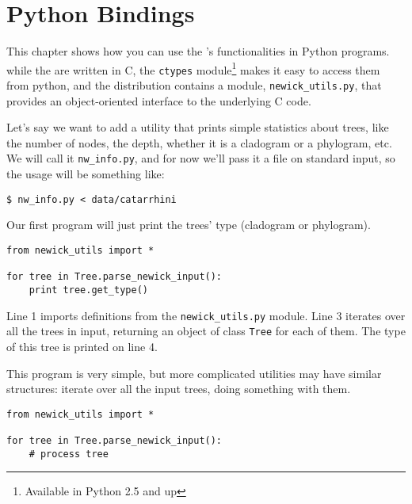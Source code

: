 
\chapter{Python Bindings}
\label{chap_python_lib}

This chapter shows how you can use the \nutils{}'s functionalities in Python
programs. while the \nutils{} are written in C, the \texttt{ctypes}
module\footnote{Available in Python 2.5 and up} makes it easy to access them
from python, and the distribution contains a module, \texttt{newick\_utils.py},
that provides an object-oriented interface to the underlying C code.

Let's say we want to add a utility that prints simple statistics about trees,
like the number of nodes, the depth, whether it is a cladogram or a phylogram,
etc. We will call it \texttt{nw\_info.py}, and for now we'll pass it a \nw{}
file on standard input, so the usage will be something like:

\begin{verbatim}
$ nw_info.py < data/catarrhini
\end{verbatim}

\noindent{}Our first program will just print the trees' type (cladogram or
phylogram).

\begin{lstlisting}
from newick_utils import *

for tree in Tree.parse_newick_input():
    print tree.get_type()
\end{lstlisting}

\noindent{}Line 1 imports definitions from the \texttt{newick\_utils.py}
module. Line 3 iterates over all the trees in input, returning an object of
class \texttt{Tree} for each of them. The type of this tree is printed on line
4.

This program is very simple, but more complicated utilities may have similar
structures: iterate over all the input trees, doing something with them.

\begin{lstlisting}
from newick_utils import *

for tree in Tree.parse_newick_input():
    # process tree
\end{lstlisting}

